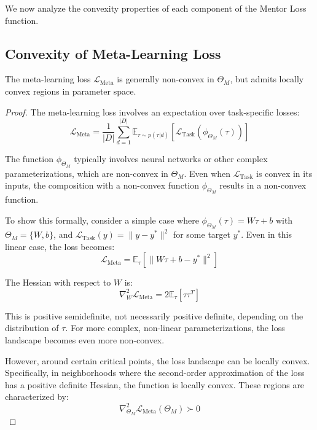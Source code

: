 We now analyze the convexity properties of each component of the Mentor Loss function.

\subsection{Convexity of Meta-Learning Loss}

\begin{theorem}
The meta-learning loss $\mathcal{L}_{\text{Meta}}$ is generally non-convex in $\Theta_M$, but admits locally convex regions in parameter space.
\end{theorem}

\begin{proof}
The meta-learning loss involves an expectation over task-specific losses:
\begin{equation}
\mathcal{L}_{\text{Meta}} = \frac{1}{|D|}\sum_{d=1}^{|D|} \mathbb{E}_{\tau \sim p(\tau|d)}\left[ \mathcal{L}_{\text{Task}}(\phi_{\Theta_M}(\tau)) \right]
\end{equation}

The function $\phi_{\Theta_M}$ typically involves neural networks or other complex parameterizations, which are non-convex in $\Theta_M$. Even when $\mathcal{L}_{\text{Task}}$ is convex in its inputs, the composition with a non-convex function $\phi_{\Theta_M}$ results in a non-convex function.

To show this formally, consider a simple case where $\phi_{\Theta_M}(\tau) = W\tau + b$ with $\Theta_M = \{W, b\}$, and $\mathcal{L}_{\text{Task}}(y) = \|y - y^*\|^2$ for some target $y^*$. Even in this linear case, the loss becomes:
\begin{equation}
\mathcal{L}_{\text{Meta}} = \mathbb{E}_{\tau}\left[ \|W\tau + b - y^*\|^2 \right]
\end{equation}

The Hessian with respect to $W$ is:
\begin{equation}
\nabla_W^2 \mathcal{L}_{\text{Meta}} = 2\mathbb{E}_{\tau}[\tau\tau^T]
\end{equation}

This is positive semidefinite, not necessarily positive definite, depending on the distribution of $\tau$. For more complex, non-linear parameterizations, the loss landscape becomes even more non-convex.

However, around certain critical points, the loss landscape can be locally convex. Specifically, in neighborhoods where the second-order approximation of the loss has a positive definite Hessian, the function is locally convex. These regions are characterized by:
\begin{equation}
\nabla^2_{\Theta_M} \mathcal{L}_{\text{Meta}}(\Theta_M) \succ 0
\end{equation}
\end{proof}


